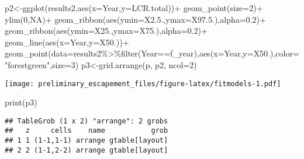 \documentclass[
]{article}
\newenvironment{Shaded}{\begin{snugshade}}{\end{snugshade}}
\newcommand{\AttributeTok}[1]{\textcolor[rgb]{0.77,0.63,0.00}{#1}}
\newcommand{\ConstantTok}[1]{\textcolor[rgb]{0.00,0.00,0.00}{#1}}
\newcommand{\DecValTok}[1]{\textcolor[rgb]{0.00,0.00,0.81}{#1}}
\newcommand{\FloatTok}[1]{\textcolor[rgb]{0.00,0.00,0.81}{#1}}
\newcommand{\FunctionTok}[1]{\textcolor[rgb]{0.00,0.00,0.00}{#1}}
\newcommand{\NormalTok}[1]{#1}
\newcommand{\OtherTok}[1]{\textcolor[rgb]{0.56,0.35,0.01}{#1}}
\newcommand{\SpecialCharTok}[1]{\textcolor[rgb]{0.00,0.00,0.00}{#1}}
\newcommand{\StringTok}[1]{\textcolor[rgb]{0.31,0.60,0.02}{#1}}
\begin{document}
\begin{Shaded}
\begin{Highlighting}[]
\NormalTok{p2}\OtherTok{\textless{}{-}}\FunctionTok{ggplot}\NormalTok{(results2,}\FunctionTok{aes}\NormalTok{(}\AttributeTok{x=}\NormalTok{Year,}\AttributeTok{y=}\NormalTok{LCR.total))}\SpecialCharTok{+}
  \FunctionTok{geom\_point}\NormalTok{(}\AttributeTok{size=}\DecValTok{2}\NormalTok{)}\SpecialCharTok{+}
  \FunctionTok{ylim}\NormalTok{(}\DecValTok{0}\NormalTok{,}\ConstantTok{NA}\NormalTok{)}\SpecialCharTok{+}
  \FunctionTok{geom\_ribbon}\NormalTok{(}\FunctionTok{aes}\NormalTok{(}\AttributeTok{ymin=}\NormalTok{X2.}\FloatTok{5.}\NormalTok{,}\AttributeTok{ymax=}\NormalTok{X97.}\FloatTok{5.}\NormalTok{),}\AttributeTok{alpha=}\FloatTok{0.2}\NormalTok{)}\SpecialCharTok{+}
  \FunctionTok{geom\_ribbon}\NormalTok{(}\FunctionTok{aes}\NormalTok{(}\AttributeTok{ymin=}\NormalTok{X25.,}\AttributeTok{ymax=}\NormalTok{X75.),}\AttributeTok{alpha=}\FloatTok{0.2}\NormalTok{)}\SpecialCharTok{+}
  \FunctionTok{geom\_line}\NormalTok{(}\FunctionTok{aes}\NormalTok{(}\AttributeTok{x=}\NormalTok{Year,}\AttributeTok{y=}\NormalTok{X50.))}\SpecialCharTok{+}
  \FunctionTok{geom\_point}\NormalTok{(}\AttributeTok{data=}\NormalTok{results2}\SpecialCharTok{\%\textgreater{}\%}\FunctionTok{filter}\NormalTok{(Year}\SpecialCharTok{==}\NormalTok{f\_year),}\FunctionTok{aes}\NormalTok{(}\AttributeTok{x=}\NormalTok{Year,}\AttributeTok{y=}\NormalTok{X50.),}\AttributeTok{color=}\StringTok{"forestgreen"}\NormalTok{,}\AttributeTok{size=}\DecValTok{3}\NormalTok{)}
\NormalTok{p3}\OtherTok{\textless{}{-}}\FunctionTok{grid.arrange}\NormalTok{(p, p2, }\AttributeTok{ncol=}\DecValTok{2}\NormalTok{)}
\end{Highlighting}
\end{Shaded}

\texttt{[image: preliminary\_escapement\_files/figure-latex/fitmodels-1.pdf]}

\begin{Shaded}
\begin{Highlighting}[]
\FunctionTok{print}\NormalTok{(p3)}
\end{Highlighting}
\end{Shaded}

\begin{verbatim}
## TableGrob (1 x 2) "arrange": 2 grobs
##   z     cells    name           grob
## 1 1 (1-1,1-1) arrange gtable[layout]
## 2 2 (1-1,2-2) arrange gtable[layout]
\end{verbatim}
\end{document}
